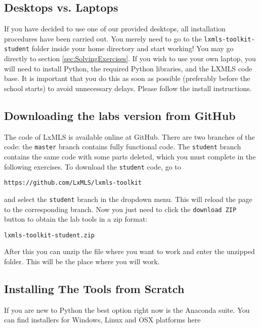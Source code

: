\subsection{Desktops vs. Laptops}

If you have decided to use one of our provided desktops, all installation
procedures have been carried out. You merely need to go to the
\verb+lxmls-toolkit-student+ folder inside your home directory and start
working! You may go directly to section \ref{sec:SolvingExercises}. If you
wish to use your own laptop, you will need to install Python, the 
required Python libraries, and the LXMLS code base. It is important that you
do this as soon as possible (preferably before the school starts) to avoid
unnecessary delays. Please follow the install instructions. 

\subsection{Downloading the labs version from GitHub}

The code of LxMLS is available online at GitHub. There are two branches of the
code: the \verb+master+ branch contains fully functional code. The
\verb+student+ branch contains the same code with some parts deleted, which you
must complete in the following exercises. To download the \verb+student+ code,
go to

\begin{verbatim}
https://github.com/LxMLS/lxmls-toolkit
\end{verbatim}

\noindent and select the \verb+student+ branch in the dropdown menu. This will
reload the page to the corresponding branch. Now you just need to click the
\verb+download ZIP+ button to obtain the lab tools in a zip format:

\begin{verbatim}
lxmls-toolkit-student.zip
\end{verbatim}

After this you can unzip the file where you want to work and enter the unzipped
folder. This will be the place where you will work.

\subsection{Installing The Tools from Scratch}

If you are new to Python the best option right now is the Anaconda suite. You
can find installers for Windows, Linux and OSX platforms here


